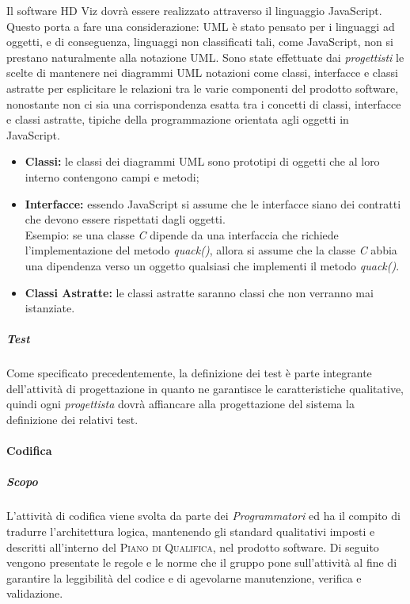 Il software HD Viz dovrà essere realizzato attraverso il linguaggio JavaScript. Questo porta a fare una considerazione: UML è stato pensato per i linguaggi ad oggetti, e di conseguenza, linguaggi non classificati tali, come JavaScript, non si prestano naturalmente alla notazione UML.
Sono state effettuate dai \emph{progettisti} le scelte di mantenere nei diagrammi UML notazioni come classi, interfacce e classi astratte per esplicitare le relazioni tra le varie componenti del prodotto software, nonostante non ci sia una corrispondenza esatta tra i concetti di classi, interfacce e classi astratte, tipiche della programmazione orientata agli oggetti in JavaScript.
\begin{itemize}
	\item \textbf{Classi:} le classi dei diagrammi UML sono prototipi di oggetti che al loro interno contengono campi e metodi;
	\item \textbf{Interfacce:} essendo JavaScript  si assume che le interfacce siano dei contratti che devono essere rispettati dagli oggetti.\\
    Esempio: se una classe \emph{C} dipende da una interfaccia che richiede l'implementazione del metodo \emph{quack()}, allora si assume che la classe \emph{C} abbia una dipendenza verso un oggetto qualsiasi che implementi il metodo \emph{quack()}.
	\item \textbf{Classi Astratte:} le classi astratte saranno classi che non verranno mai istanziate.
\end{itemize}

\subparagraph{Test}

Come specificato precedentemente, la definizione dei test è parte integrante dell'attività di progettazione in quanto ne garantisce le caratteristiche qualitative, quindi ogni \emph{progettista} dovrà affiancare alla progettazione del sistema la definizione dei relativi test.


\paragraph{Codifica}
\label{ssub:codifica}
\subparagraph{Scopo}
\label{par:codifica:scopo}
L'attività di codifica viene svolta da parte dei \emph{Programmatori} ed ha il compito di tradurre l'architettura logica, mantenendo gli
standard qualitativi imposti e descritti all'interno del \textsc{Piano di Qualifica}, nel prodotto software. Di seguito vengono presentate
le regole e le norme che il gruppo pone sull'attività al fine di garantire la leggibilità del codice e di agevolarne manutenzione,
verifica e validazione.

